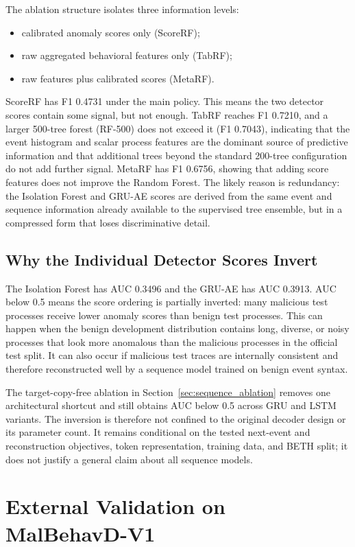 \documentclass[10pt,journal,compsoc]{IEEEtran}
\begin{document}
The ablation structure isolates three information levels:
\begin{itemize}
    \item calibrated anomaly scores only (ScoreRF);
    \item raw aggregated behavioral features only (TabRF);
    \item raw features plus calibrated scores (MetaRF).
\end{itemize}
ScoreRF has F1 0.4731 under the main policy. This means the two detector scores contain some signal, but not enough. TabRF reaches F1 0.7210, and a larger 500-tree forest (RF-500) does not exceed it (F1 0.7043), indicating that the event histogram and scalar process features are the dominant source of predictive information and that additional trees beyond the standard 200-tree configuration do not add further signal. MetaRF has F1 0.6756, showing that adding score features does not improve the Random Forest. The likely reason is redundancy: the Isolation Forest and GRU-AE scores are derived from the same event and sequence information already available to the supervised tree ensemble, but in a compressed form that loses discriminative detail.

\subsection{Why the Individual Detector Scores Invert}

The Isolation Forest has AUC 0.3496 and the GRU-AE has AUC 0.3913. AUC below 0.5 means the score ordering is partially inverted: many malicious test processes receive lower anomaly scores than benign test processes. This can happen when the benign development distribution contains long, diverse, or noisy processes that look more anomalous than the malicious processes in the official test split. It can also occur if malicious test traces are internally consistent and therefore reconstructed well by a sequence model trained on benign event syntax.

The target-copy-free ablation in Section~\ref{sec:sequence_ablation} removes one architectural shortcut and still obtains AUC below 0.5 across GRU and LSTM variants. The inversion is therefore not confined to the original decoder design or its parameter count. It remains conditional on the tested next-event and reconstruction objectives, token representation, training data, and BETH split; it does not justify a general claim about all sequence models.

\section{External Validation on MalBehavD-V1}
\label{sec:external_malbehavd}
\end{document}
